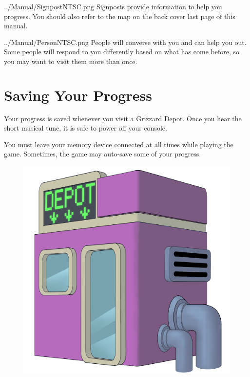 \documentclass[10pt,twocolumn,openany,article]{memoir}
\begin{document}
\lettrine[image=true,                lines=5,               findent=3pt,
nindent=3pt]{../Manual/SignpostNTSC.png}{} Signposts provide information
to  help  you  progress.  You  should  also refer  to  the  map  on  the
\ifdefined\ATARIAGESAVE back cover \else last page \fi{} of this manual.

\ifdefined\ATARIAGESAVE\vspace{14pt}\else\vspace{30pt}\fi

\lettrine[image=true,                lines=5,               findent=3pt,
nindent=3pt]{../Manual/PersonNTSC.png}{} People  will converse  with you
and can help you out. Some  people will respond to you differently based
on what has come before, so you may want to visit them more than once.


\ifdefined\NOSAVE\else

\section{Saving Your Progress}

Your progress  is saved whenever  you visit  a Grizzard Depot.  Once you
hear the short musical tune, it is safe to power off your console.

\ifdefined\ATARIAGESAVE\else

You must leave  your memory device connected at all  times while playing
the game. Sometimes, the game may auto-save some of your progress.

\fi \fi

\begin{figure}[t]
  \begin{center}
    \includegraphics[width=2\columnwidth]{../Manual/GrizzardDepot.png}
  \end{center}
\end{figure}
\end{document}
